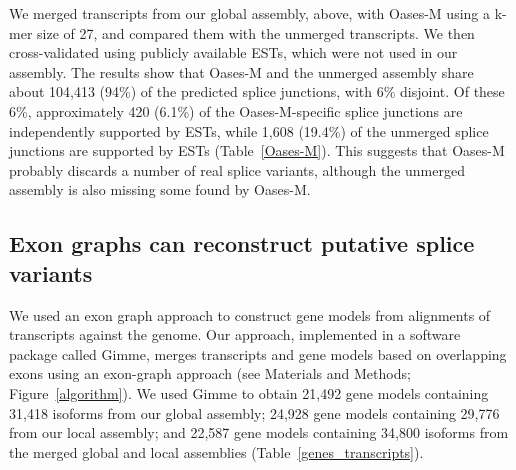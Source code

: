 \documentclass[10pt]{article}
\begin{document}

We merged transcripts from our global assembly, above, with Oases-M using a
k-mer size of 27, and compared them with the unmerged transcripts.  We then
cross-validated using publicly available ESTs, which were not used in our
assembly.  The results show that Oases-M and the unmerged assembly share about
104,413 (94\%) of the predicted splice junctions, with 6\% disjoint.  Of these
6\%, approximately 420 (6.1\%) of the Oases-M-specific splice junctions are
independently supported by ESTs, while 1,608 (19.4\%) of the unmerged splice
junctions are supported by ESTs (Table~\ref{Oases-M}).  This suggests that Oases-M
probably discards a number of real splice variants, although the unmerged
assembly is also missing some found by Oases-M.





\subsection*{Exon graphs can reconstruct putative splice variants}

We used an exon graph approach to construct gene models from
alignments of transcripts against the genome.  Our approach,
implemented in a software package called Gimme, merges transcripts and
gene models based on overlapping exons using an exon-graph approach
(see Materials and Methods; Figure~\ref{algorithm}).  We used Gimme to obtain
21,492 gene models containing 31,418 isoforms from our global
assembly; 24,928 gene models containing 29,776 from our local
assembly; and 22,587 gene models containing 34,800 isoforms from the
merged global and local assemblies (Table~\ref{genes_transcripts}).
\end{document}
